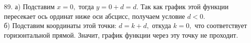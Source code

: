89. а) Подставим $x=0,$ тогда $y=0+d=d.$ Так как график этой функции пересекает ось ординат ниже оси абсцисс, получаем условие $d<0.$\\
б) Подставим координаты этой точки: $d=k+d,$ откуда $k=0,$ что соответствует горизонтальной прямой. Значит, график функции через эту точку не проходит.\\
